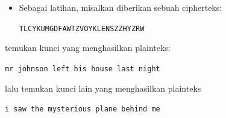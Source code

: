 \documentclass{article}
\begin{document}

\begin{itemize}
    \item Sebagai latihan, misalkan diberikan sebuah cipherteks:
    \begin{center}
        \texttt{TLCYKUMGDFAWTZVOYKLENSZZHYZRW}
    \end{center}
\end{itemize}

temukan kunci yang menghasilkan plainteks:
\begin{center}
    \texttt{mr johnson left his house last night}
\end{center}

lalu temukan kunci lain yang menghasilkan plainteks
\begin{center}
    \texttt{i saw the mysterious plane behind me}
\end{center}
\end{document}
